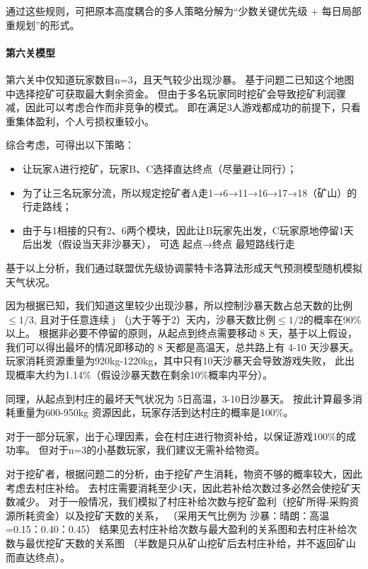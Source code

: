 通过这些规则，可把原本高度耦合的多人策略分解为“少数关键优先级 + 每日局部重规划”的形式。

\paragraph{第六关模型}

第六关中仅知道玩家数目n=3，且天气较少出现沙暴。
%
基于问题二已知这个地图中选择挖矿可获取最大剩余资金。
%
但由于多名玩家同时挖矿会导致挖矿利润骤减，因此可以考虑合作而非竞争的模式。
%
即在满足3人游戏都成功的前提下，只看重集体盈利，个人亏损权重较小。

综合考虑，可得出以下策略：

\begin{itemize}
    \item 让玩家A进行挖矿，玩家B、C选择直达终点（尽量避让同行）；
    \item 为了让三名玩家分流，所以规定挖矿者A走1→6→11→16→17→18（矿山）的行走路线；
    \item 由于与1相接的只有2、6两个模块，因此让B玩家先出发，C玩家原地停留1天后出发（假设当天非沙暴天），
        可选 起点→终点 最短路线行走
\end{itemize}

基于以上分析，我们通过联盟优先级协调蒙特卡洛算法形成天气预测模型随机模拟天气状况。

因为根据已知，我们知道这里较少出现沙暴，所以控制沙暴天数占总天数的比例$\leq 1/3$, 
%
且对于任意连续 j （j大于等于2）天内，沙暴天数比例$\leq 1/2$的概率在90\%以上。
%
根据非必要不停留的原则，从起点到终点需要移动 8 天，基于以上假设，
%
我们可以得出最坏的情况即移动的 8 天都是高温天，总共路上有  4-10 天沙暴天。
%
玩家消耗资源重量为920kg-1220kg，其中只有10天沙暴天会导致游戏失败，
%
此出现概率大约为1.14\%（假设沙暴天数在剩余10\%概率内平分）。

同理，从起点到村庄的最坏天气状况为 5日高温，3-10日沙暴天。
%
按此计算最多消耗重量为600-950kg 资源因此，玩家存活到达村庄的概率是100\%。

对于一部分玩家，出于心理因素，会在村庄进行物资补给，以保证游戏100\%的成功率。
%
但对于n=3的小基数玩家，我们建议无需补给物资。

对于挖矿者，根据问题二的分析，由于挖矿产生消耗，物资不够的概率较大，因此考虑去村庄补给。
%
去村庄需要消耗至少4天，因此若补给次数过多必然会使挖矿天数减少。
%
对于一般情况，我们模拟了村庄补给次数与挖矿盈利（挖矿所得-采购资源所耗资金）以及挖矿天数的关系，%
（采用天气比例为 沙暴：晴朗：高温=0.15：0.40：0.45）
%
结果见去村庄补给次数与最大盈利的关系图和去村庄补给次数与最优挖矿天数的关系图
%
（半数是只从矿山挖矿后去村庄补给，并不返回矿山而直达终点）。

